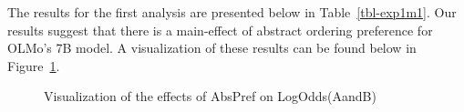 \documentclass[
  12pt,
  letterpaper,
]{scrreport}
\begin{document}
The results for the first analysis are presented below in
Table~\ref{tbl-exp1m1}. Our results suggest that there is a main-effect
of abstract ordering preference for OLMo's 7B model. A visualization of
these results can be found below in Figure~\ref{fig-exp1m1}.

\begin{table}

\caption{\label{tbl-exp1m1}Model results examining the effect of AbsPref
on LogOdds(AandB).}


\end{table}%

\begin{figure}[htbp]

\caption{\label{fig-exp1m1}Visualization of the effects of AbsPref on
LogOdds(AandB)}


\end{figure}%
\end{document}

